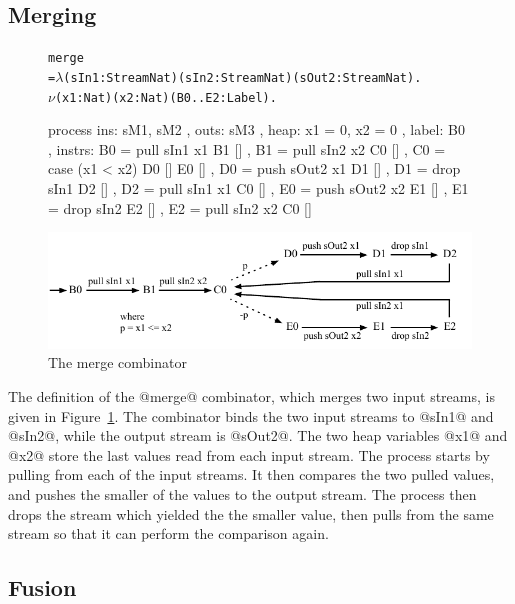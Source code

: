 \subsection{Merging}
\begin{figure}
\begin{alltt}
       merge
         = \(\lambda\) (sIn1: Stream Nat) (sIn2: Stream Nat) (sOut2: Stream Nat). 
           \(\nu\) (x1: Nat) (x2: Nat) (B0..E2: Label).
\end{alltt}
\begin{code}
           process
            { ins:    { sM1, sM2 }
            , outs:   { sM3 }
            , heap:   { x1 = 0, x2 = 0 }
            , label:  B0
            , instrs: { B0 = pull sIn1  x1   B1 []             , B1 = pull sIn2  x2   C0 []
                      , C0 = case (x1 < x2)  D0 []  E0 []      , D0 = push sOut2 x1   D1 []
                      , D1 = drop sIn1       D2 []             , D2 = pull sIn1  x1   C0 []
                      , E0 = push sOut2 x2   E1 []             , E1 = drop sIn2       E2 []
                      , E2 = pull sIn2 x2    C0 [] } }
\end{code}
\includegraphics[scale=1.0]{figures/state-merge.pdf}
\caption{The merge combinator}
\label{fig:Process:Merge}
\end{figure}

The definition of the @merge@ combinator, which merges two input streams, is given in Figure~\ref{fig:Process:Merge}. The combinator binds the two input streams to @sIn1@ and @sIn2@, while the output stream is @sOut2@. The two heap variables @x1@ and @x2@ store the last values read from each input stream. The process starts by pulling from each of the input streams. It then compares the two pulled values, and pushes the smaller of the values to the output stream. The process then drops the stream which yielded the the smaller value, then pulls from the same stream so that it can perform the comparison again.


\subsection{Fusion}


